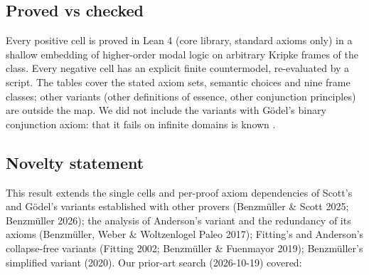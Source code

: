 \documentclass{article}
\begin{document}
\subsection*{Proved vs checked}

Every positive cell is proved in Lean 4 (core library, standard axioms only) in a shallow
embedding of higher-order modal logic on arbitrary Kripke frames of the class. Every negative
cell has an explicit finite countermodel, re-evaluated by a script. The tables cover the stated
axiom sets, semantic choices and nine frame classes; other variants (other definitions of
essence, other conjunction principles) are outside the map. We did not include the variants with
Gödel's binary conjunction axiom: that it fails on infinite domains is known
\cite{benzmueller2026ultrafilters}.

\subsection*{Novelty statement}

This result extends the single cells and per-proof axiom dependencies of Scott's and Gödel's variants established with other provers (Benzmüller \& Scott 2025; Benzmüller 2026); the analysis of Anderson's variant and the redundancy of its axioms (Benzmüller, Weber \& Woltzenlogel Paleo 2017); Fitting's and Anderson's collapse-free variants (Fitting 2002; Benzmüller \& Fuenmayor 2019); Benzmüller's simplified variant (2020). Our prior-art search (2026-10-19) covered:
\end{document}
